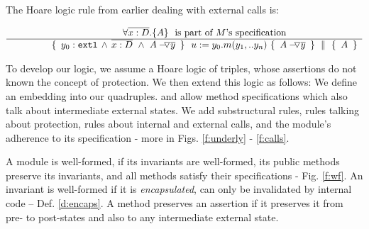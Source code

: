 The Hoare logic rule from earlier dealing with external calls is:
 
 $\inferruleNoName  
 	{ 
   	   {\TwoStatesN {\overline {x:D}} {A}}\ \   \mbox{is part of $M$'s specification}
        }
	{   \quadruple { \    { \external{y_0}} \,     \wedge \,  \overline{x:D}\  \wedge\  {\PushAS {y}{A}}\ }  
						{ \ u:=y_0.m(y_1,.. y_n)\    }
						{ \    {\PushAS {y}{A}}  \ }
						{\  A  \ }
         }
$

\vspace{.1cm}

To develop our logic, we     assume a  Hoare logic of  triples, whose assertions do not known the concept of protection.
We then extend this logic as follows: We define an embedding into our quadruples. 
and allow method specifications which also talk about intermediate external states.
We add substructural rules, rules talking about protection,   rules about internal and external calls, 
and the module's adherence to its 
specification - more in Figs. \ref{f:underly} -  \ref{f:calls}. %
 
 \vspace{.1cm}
A module is well-formed, if  its invariants are well-formed,    its public methods preserve   its invariants, and  all  methods satisfy their specifications - \cf  Fig.  \ref{f:wf}.
%
An invariant is well-formed if %
it is \emph{encapsulated}, \ie can only be invalidated by internal code %
-- \cf Def. \ref{d:encaps}. 
% 
A method preserves an assertion   if it preserves it   from pre- to  post-states and also to any intermediate external state.

